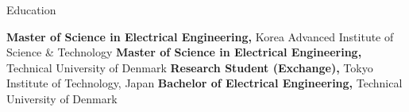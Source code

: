 
\begin{rubric}{\faGraduationCap[solid] Education}

\entry*[2021 -- 2023][]%
	\textbf{Master of Science in Electrical Engineering,} Korea Advanced Institute of Science \& Technology
%
\entry*[2021 -- 2023][]%
	\textbf{Master of Science in Electrical Engineering,} Technical University of Denmark
% 
\entry*[2020][]%
	\textbf{Research Student (Exchange),} Tokyo Institute of Technology, Japan
%
\entry*[2018 -- 2020][]%
	\textbf{Bachelor of Electrical Engineering,} Technical University of Denmark
% 
% 
\end{rubric}